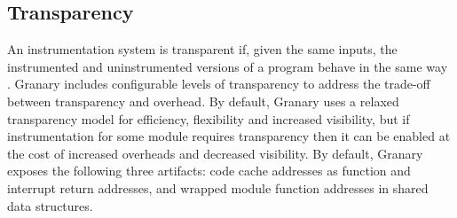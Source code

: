 \documentclass[preprint]{sigplanconf}
\begin{document}



\subsection{Transparency}\label{sec:transparency}

An instrumentation system is transparent if, given the same inputs, the instrumented and uninstrumented versions of a program behave in the same way \cite{Transparency}. Granary includes configurable levels of transparency to address the trade-off between transparency and overhead. By default, Granary uses a relaxed transparency model for efficiency, flexibility and increased visibility, but if instrumentation for some module requires transparency then it can be enabled at the cost of increased overheads and decreased visibility. By default, Granary exposes the following three artifacts: code cache addresses as function and interrupt return addresses, and wrapped module function addresses in shared data structures.
\end{document}
